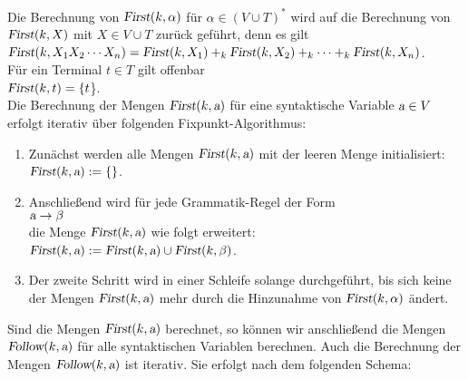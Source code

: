 \noindent
Die Berechnung von $\textsl{First}(k,\alpha)$ für $\alpha \in (V \cup T)^*$ wird auf die
Berechnung von $\textsl{First}(k, X)$ mit $X \in V \cup T$ zurück geführt,
denn es gilt
\\[0.2cm]
\hspace*{1.3cm}
$\textsl{First}(k, X_1 X_2 \cdots X_n) = 
 \textsl{First}(k, X_1) +_k \textsl{First}(k, X_2) +_k \cdots +_k \textsl{First}(k, X_n)$.
\\[0.2cm]
Für ein Terminal $t \in T$ gilt offenbar
\\[0.2cm]
\hspace*{1.3cm}
$\textsl{First}(k, t) = \{t$\}.
\\[0.2cm]
Die Berechnung der Mengen $\textsl{First}(k, \textsl{a})$ für eine syntaktische Variable $\textsl{a} \in V$
erfolgt iterativ über folgenden Fixpunkt-Algorithmus:
\begin{enumerate}
\item Zunächst werden alle Mengen $\textsl{First}(k, \textsl{a})$ mit der leeren Menge initialisiert:
      \\[0.2cm]
      \hspace*{1.3cm}
      $\textsl{First}(k, \textsl{a}) := \{\}$.
\item Anschließend wird für jede Grammatik-Regel der Form 
      \\[0.2cm]
      \hspace*{1.3cm}
      $\textsl{a} \rightarrow \beta$
      \\[0.2cm]
      die Menge $\textsl{First}(k, \textsl{a})$ wie folgt erweitert:
      \\[0.2cm]
      \hspace*{1.3cm}
      $\textsl{First}(k, \textsl{a}) := \textsl{First}(k, \textsl{a}) \cup \textsl{First}(k,\beta)$.
\item Der zweite Schritt wird in einer Schleife solange durchgeführt, bis sich keine
      der Mengen $\textsl{First}(k, \textsl{a})$ mehr durch die Hinzunahme von
      $\textsl{First}(k,\alpha)$ ändert.
\end{enumerate}
Sind die Mengen $\textsl{First}(k, \textsl{a})$ berechnet, so können wir anschließend die Mengen 
$\textsl{Follow}(k, \textsl{a})$ für alle syntaktischen Variablen berechnen.  Auch die Berechnung
der Mengen $\textsl{Follow}(k, \textsl{a})$ ist iterativ.  Sie erfolgt nach dem folgenden
Schema:
